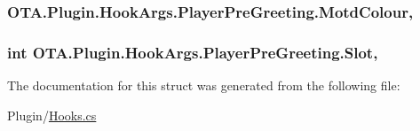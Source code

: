 \subsubsection[{Motd\+Colour}]{ O\+T\+A.\+Plugin.\+Hook\+Args.\+Player\+Pre\+Greeting.\+Motd\+Colour\hspace{0.3cm}{\ttfamily [get]}, {\ttfamily [set]}}\label{struct_o_t_a_1_1_plugin_1_1_hook_args_1_1_player_pre_greeting_a06a01994188da5c32fc729b7f73d7988}
\hypertarget{struct_o_t_a_1_1_plugin_1_1_hook_args_1_1_player_pre_greeting_a3e28270bcc3a819a4851e81d29e68b8c}{}
\subsubsection[{Slot}]{\setlength{\rightskip}{0pt plus 5cm}int O\+T\+A.\+Plugin.\+Hook\+Args.\+Player\+Pre\+Greeting.\+Slot\hspace{0.3cm}{\ttfamily [get]}, {\ttfamily [set]}}\label{struct_o_t_a_1_1_plugin_1_1_hook_args_1_1_player_pre_greeting_a3e28270bcc3a819a4851e81d29e68b8c}


The documentation for this struct was generated from the following file\+:\begin{DoxyCompactItemize}
\item 
Plugin/\hyperlink{_hooks_8cs}{Hooks.\+cs}\end{DoxyCompactItemize}
